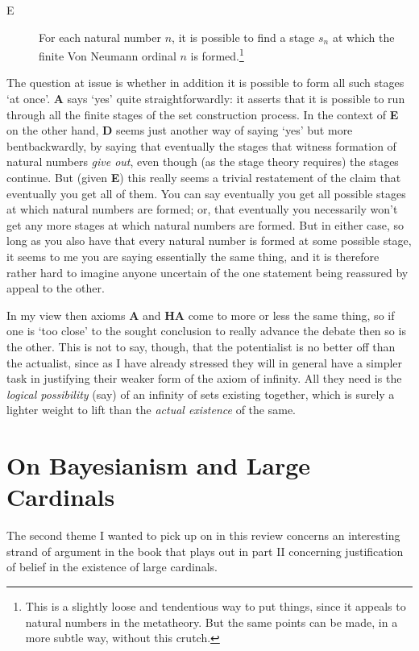 \documentclass{amsart}
\theoremstyle{definition}
\begin{document}
\begin{description} 
    \item[E] For each natural number $n$, 
    it is possible to find a stage $s_n$ at which the 
    finite Von Neumann ordinal $n$ is formed.\footnote{
        This is a slightly loose and tendentious way to put things,
        since it appeals to natural numbers in the metatheory. But
        the same points can be made, in a more subtle way, without
        this crutch.
    }
\end{description} 
The question at issue is whether in addition it is possible to form 
all such stages `at once'. {\bf A} says `yes' quite straightforwardly: 
it asserts that it is possible to run through all the finite stages 
of the set construction process. In the context of {\bf E} on the other hand, 
{\bf D} seems just another way of saying `yes' but more bentbackwardly, 
by saying that eventually the stages that witness formation of natural numbers 
\emph{give out}, 
even though (as the stage theory requires) the stages continue. 
But (given {\bf E}) this really seems a trivial restatement of the 
claim that eventually you get all of them.  You can say eventually you get 
all possible stages at which natural numbers 
are formed; or, that eventually you necessarily won't get any more stages at which natural 
numbers are formed. But in either case,
so long as you also have that every natural 
number is formed at some possible stage,
it seems to me you are saying essentially the same thing, 
and it is therefore rather hard to imagine anyone uncertain of the 
one statement being reassured by appeal to the other.

In my view then axioms {\bf A} and {\bf HA} come to more or less the 
same thing, so if one is `too close' to the sought conclusion to really advance 
the debate then so is the other. 
This is not to say, though, that the potentialist is no 
better off than the actualist, 
since as I have already stressed they will in general have 
a simpler task in justifying 
their weaker form of the axiom of infinity.
All they need is the \emph{logical possibility}
(say) of an infinity of sets existing together, which is surely 
a lighter weight to lift than the \emph{actual existence} of the same.

\section{On Bayesianism and Large Cardinals}

The second theme I wanted to pick up on in this review concerns an interesting
strand of argument in the book that plays out in part II concerning justification
of belief in the existence of large cardinals. 
\end{document}

